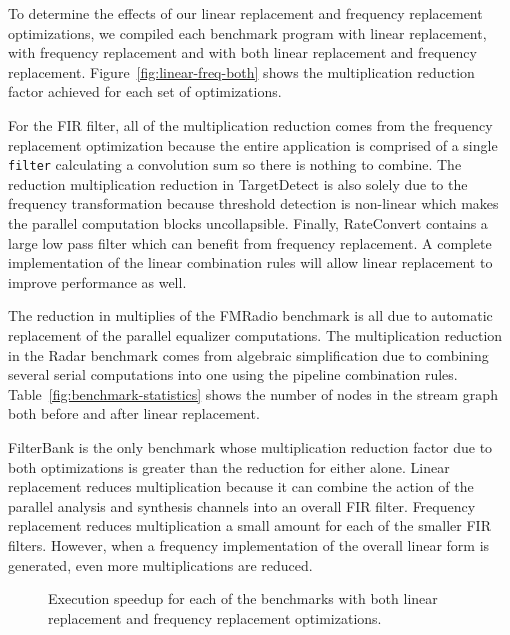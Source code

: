 To determine the effects of our linear replacement and frequency replacement 
optimizations, we compiled each benchmark program with linear 
replacement, with frequency replacement and with both linear 
replacement and frequency replacement. 
Figure~\ref{fig:linear-freq-both} shows the multiplication reduction factor 
achieved for each set of optimizations.

For the FIR filter, all of the multiplication reduction comes from the frequency
replacement optimization because the entire application is comprised of a single
{\tt filter} calculating a convolution sum so there is nothing to combine.
The reduction multiplication reduction in TargetDetect is also solely due to 
the frequency transformation because threshold detection is non-linear which
makes the parallel computation blocks uncollapsible. Finally, RateConvert contains
a large low pass filter which can benefit from frequency replacement. A complete
implementation of the linear combination rules will allow linear replacement 
to improve performance as well.

The reduction in multiplies of the FMRadio benchmark is all due to
automatic replacement of the parallel equalizer computations.
The multiplication reduction in the Radar benchmark comes from algebraic  
simplification due to combining several serial computations into one using
the pipeline combination rules. Table~\ref{fig:benchmark-statistics} shows
the number of nodes in the stream graph both before and after linear replacement. 

FilterBank is the only benchmark whose multiplication reduction factor due to both optimizations
is greater than the reduction for either alone. Linear replacement reduces
multiplication because it can combine the action of the parallel analysis 
and synthesis channels into an overall FIR filter. Frequency replacement reduces
multiplication a small amount for each of the smaller FIR filters. However, when
a frequency implementation of the overall linear form is generated,
even more multiplications are reduced.

\begin{figure}
\center
\epsfxsize=3.2in
\vspace{-6pt}
\caption{Execution speedup for each of the benchmarks with both linear replacement and frequency replacement optimizations.}
\label{fig:execution-speedup}
\vspace{-12pt}
\end{figure}

